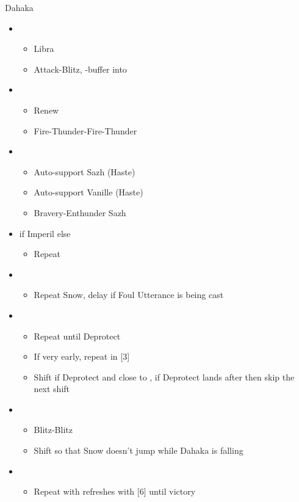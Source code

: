 \documentclass{report}
\begin{document}
\begin{battle}{Dahaka}
\begin{itemize}
    \item \second
    \begin{itemize}
        \item Libra
        \item Attack-Blitz, \rav-buffer into
    \end{itemize}
    \item \fifth
    \begin{itemize}
        \item Renew
        \item Fire-Thunder-Fire-Thunder
    \end{itemize}
    \item \first
    \begin{itemize}
        \item Auto-support Sazh (Haste)
        \item Auto-support Vanille (Haste)
        \item Bravery-Enthunder Sazh
    \end{itemize}
    \item \fifth if Imperil else \third
    \begin{itemize}
        \item Repeat
    \end{itemize}
    \item \first
    \begin{itemize}
        \item Repeat Snow, delay if Foul Utterance is being cast
    \end{itemize}
    \item \fifth
    \begin{itemize}
        \item Repeat until Deprotect
        \item If very early, repeat in [3]
        \item Shift if Deprotect and close to \stagger, if Deprotect lands after \stagger then skip the next shift
    \end{itemize}
    \item \second
    \begin{itemize}
        \item Blitz-Blitz
        \item Shift so that Snow doesn't jump while Dahaka is falling
    \end{itemize}
    \item \fourth
    \begin{itemize}
        \item Repeat with refreshes with [6] until victory
    \end{itemize}
\end{itemize}
\end{battle}
\end{document}
